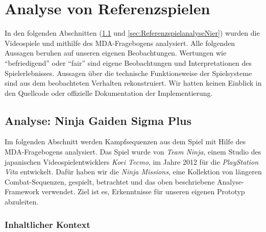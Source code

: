 \documentclass[../Main.tex]{subfiles}
\begin{document}
\section{Analyse von Referenzspielen} \label{sec:Referenzspielanalyse}

In den folgenden Abschnitten (\ref{sec:ReferenzspielanalyseNinja} und \ref{sec:ReferenzspielanalyseNier}) wurden die Videospiele  und  mithilfe des MDA-Fragebogens analysiert. Alle folgenden Aussagen beruhen auf unseren eigenen Beobachtungen. Wertungen wie \enquote{befriedigend} oder \enquote{fair} sind eigene Beobachtungen und Interpretationen des Spielerlebnisses. Aussagen über die technische Funktionsweise der Spielsysteme sind aus dem beobachteten Verhalten rekonstruiert. Wir hatten keinen Einblick in den Quellcode oder offizielle Dokumentation der Implementierung.

\subsection{Analyse: Ninja Gaiden Sigma Plus} \label{sec:ReferenzspielanalyseNinja}

Im folgenden Abschnitt werden Kampfsequenzen aus dem Spiel  mit Hilfe des MDA-Fragebogens analysiert. Das Spiel wurde von \textit{Team Ninja}, einem Studio des japanischen Videospielentwicklers \textit{Koei Tecmo}, im Jahre 2012 für die \textit{PlayStation Vita} entwickelt.\autocite{wikipedia_ninjagaiden_2026} Dafür haben wir die \textit{Ninja Missions}, eine Kollektion von längeren Combat-Sequenzen, gespielt, betrachtet und das oben beschriebene Analyse-Framework verwendet. Ziel ist es, Erkenntnisse für unseren eigenen Prototyp abzuleiten.

\subsubsection{Inhaltlicher Kontext}
\end{document}
